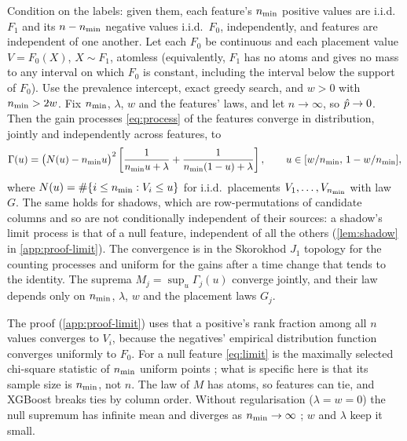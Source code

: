 \begin{theorem}\label{thm:limit}
Condition on the labels: given them, each feature's $n_{\min}$ positive values are i.i.d.\ $F_1$ and its $n-n_{\min}$ negative values i.i.d.\ $F_0$, independently, and features are independent of one another. Let each $F_0$ be continuous and each placement value $V = F_0(X)$, $X\sim F_1$, atomless (equivalently, $F_1$ has no atoms and gives no mass to any interval on which $F_0$ is constant, including the interval below the support of $F_0$). Use the prevalence intercept, exact greedy search, and $w > 0$ with $n_{\min} > 2w$. Fix $n_{\min}$, $\lambda$, $w$ and the features' laws, and let $n \to \infty$, so $\hat p \to 0$. Then the gain processes \eqref{eq:process} of the features converge in distribution, jointly and independently across features, to
\begin{equation}\label{eq:limit}
  \Gamma(u) = \bigl(N(u) - n_{\min} u\bigr)^2\left[\frac{1}{n_{\min} u+\lambda} + \frac{1}{n_{\min}(1-u)+\lambda}\right],\qquad u\in[w/n_{\min},\,1-w/n_{\min}],
\end{equation}
where $N(u) = \#\{i \le n_{\min} : V_i \le u\}$ for i.i.d.\ placements $V_1,\dots,V_{n_{\min}}$ with law $G$. The same holds for shadows, which are row-permutations of candidate columns and so are not conditionally independent of their sources: a shadow's limit process is that of a null feature, independent of all the others (\cref{lem:shadow} in \cref{app:proof-limit}). The convergence is in the Skorokhod $J_1$ topology for the counting processes and uniform for the gains after a time change that tends to the identity. The suprema $M_j = \sup_u \Gamma_j(u)$ converge jointly, and their law depends only on $n_{\min}$, $\lambda$, $w$ and the placement laws $G_j$.
\end{theorem}

The proof (\cref{app:proof-limit}) uses that a positive's rank fraction among all $n$ values converges to $V_i$, because the negatives' empirical distribution function converges uniformly to $F_0$. For a null feature \eqref{eq:limit} is the maximally selected chi-square statistic of $n_{\min}$ uniform points \citep{miller1982maximally,lausen1992maximally}; what is specific here is that its sample size is $n_{\min}$, not $n$. The law of $M$ has atoms, so features can tie, and XGBoost breaks ties by column order. Without regularisation ($\lambda = w = 0$) the null supremum has infinite mean and diverges as $n_{\min} \to \infty$ \citep{jaeschke1979asymptotic,donoho2004higher}; $w$ and $\lambda$ keep it small.

